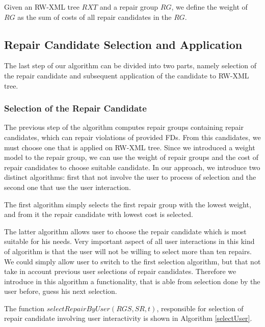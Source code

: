 \begin{define}
Given an RW-XML tree $RXT$ and a repair group $RG$, we define the weight of $RG$ as the sum of costs of all repair candidates in the $RG$.
\end{define}

\subsection{Repair Candidate Selection and Application}

The last step of our algorithm can be divided into two parts, namely selection of the repair candidate and subsequent application of the candidate to RW-XML tree.

\subsubsection{Selection of the Repair Candidate}

The previous step of the algorithm computes repair groups containing repair candidates, which can repair violations of provided FDs. From this candidates, we must choose one that is applied on RW-XML tree. Since we introduced a weight model to the repair group, we can use the weight of repair groups and the cost of repair candidates to choose suitable candidate. In our approach, we introduce two distinct algorithms: first that not involve the user to process of selection and the second one that use the user interaction.

The first algorithm simply selects the first repair group with the lowest weight, and from it the repair candidate with lowest cost is selected.

The latter algorithm allows user to choose the repair candidate which is most suitable for his needs. Very important aspect of all user interactions in this kind of algorithm is that the user will not be willing to select more than ten repairs. We could simply allow user to switch to the first selection algorithm, but that not take in account previous user selections of repair candidates. Therefore we introduce in this algorithm a functionality, that is able from selection done by the user before, guess his next selection.

The function $selectRepairByUser(RGS, SR, t)$, responsible for selection of repair candidate involving user interactivity is shown in Algorithm \ref{selectUser}.

